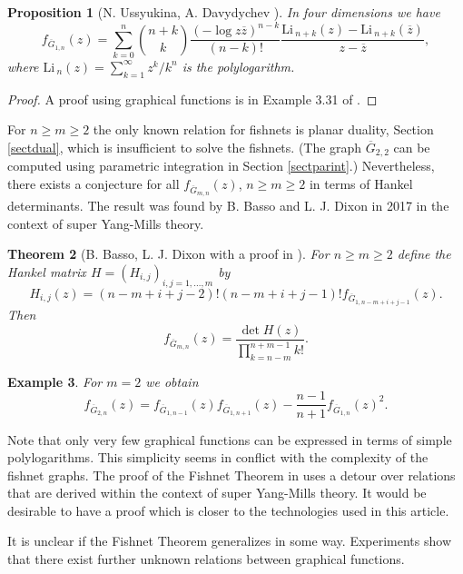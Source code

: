 \documentclass[oneside]{amsart}
\newcommand{\Li}{\mathrm{Li}\,}
\newcommand{\zz}{{\overline{z}}}
\newcommand{\Gg}{{\overline{G}}}
\theoremstyle{plain}
\newtheorem{thm}{Theorem}
\newtheorem{prop}[thm]{Proposition}
\newtheorem{ex}[thm]{Example}
\begin{document}
\begin{prop}[N. Ussyukina, A. Davydychev \cite{Ladder}]
In four dimensions we have
\begin{equation}
f_{\Gg_{1,n}}(z)=\sum_{k=0}^n\binom{n+k}{k}\frac{(-\log z\zz)^{n-k}}{(n-k)!}\frac{\Li_{n+k}(z)-\Li_{n+k}(\zz)}{z-\zz},
\end{equation}
where $\Li_n(z)=\sum_{k=1}^\infty z^k/k^n$ is the polylogarithm.
\end{prop}
\begin{proof}
A proof using graphical functions is in Example 3.31 of \cite{gf}.
\end{proof}

For $n\geq m\geq2$ the only known relation for fishnets is planar duality, Section \ref{sectdual}, which is insufficient to solve the fishnets.
(The graph $\Gg_{2,2}$ can be computed using parametric integration in Section \ref{sectparint}.) Nevertheless, there exists a conjecture for all $f_{\Gg_{m,n}}(z)$, $n\geq m\geq2$ in terms
of Hankel determinants. The result was found by B. Basso and L. J. Dixon in 2017 in the context of super Yang-Mills theory.

\begin{thm}[B. Basso, L. J. Dixon \cite{fishnet} with a proof in \cite{fishnet2}]\label{confish}
For $n\geq m\geq2$ define the Hankel matrix $H=(H_{i,j})_{i,j=1,\ldots,m}$ by
\begin{equation}
H_{i,j}(z)=(n-m+i+j-2)!(n-m+i+j-1)!f_{\Gg_{1,n-m+i+j-1}}(z).
\end{equation}
Then
\begin{equation}\label{eqfishnet}
f_{\Gg_{m,n}}(z)=\frac{\det H(z)}{\prod_{k=n-m}^{n+m-1}k!}.
\end{equation}
\end{thm}

\begin{ex}
For $m=2$ we obtain
$$
f_{\Gg_{2,n}}(z)=f_{\Gg_{1,n-1}}(z)f_{\Gg_{1,n+1}}(z)-\frac{n-1}{n+1}f_{\Gg_{1,n}}(z)^2.
$$
\end{ex}
Note that only very few graphical functions can be expressed in terms of simple polylogarithms. This simplicity seems in conflict with the complexity of the fishnet graphs.
The proof of the Fishnet Theorem in \cite{fishnet2} uses a detour over relations that are derived within the context of super Yang-Mills theory. It would be desirable to have a proof
which is closer to the technologies used in this article.

It is unclear if the Fishnet Theorem generalizes in some way. Experiments show that there exist further unknown relations between graphical functions.
\end{document}
